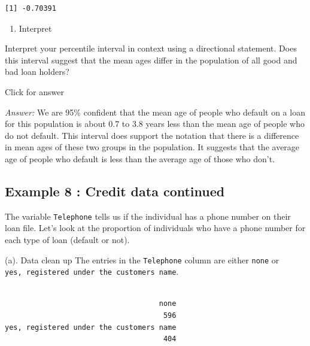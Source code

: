 \documentclass[
]{book}
\newenvironment{Shaded}{\begin{snugshade}}{\end{snugshade}}
\newcommand{\FunctionTok}[1]{\textcolor[rgb]{0.00,0.00,0.00}{#1}}
\newcommand{\NormalTok}[1]{#1}
\newcommand{\SpecialCharTok}[1]{\textcolor[rgb]{0.00,0.00,0.00}{#1}}
\providecommand{\tightlist}{%
  \setlength{\itemsep}{0pt}\setlength{\parskip}{0pt}}
\begin{document}
\begin{verbatim}
[1] -0.70391
\end{verbatim}

\begin{enumerate}
\def\labelenumi{(\alph{enumi})}
\setcounter{enumi}{2}
\tightlist
\item
  Interpret
\end{enumerate}

Interpret your percentile interval in context using a directional statement. Does this interval suggest that the mean ages differ in the population of all good and bad loan holders?

Click for answer

\emph{Answer:} We are 95\% confident that the mean age of people who default on a loan for this population is about 0.7 to 3.8 years less than the mean age of people who do not default. This interval does support the notation that there is a difference in mean ages of these two groups in the population. It suggests that the average age of people who default is less than the average age of those who don't.

\hypertarget{example-8-credit-data-continued}{%
\subsection{Example 8 : Credit data continued}\label{example-8-credit-data-continued}}

The variable \texttt{Telephone} tells us if the individual has a phone number on their loan file. Let's look at the proportion of individuals who have a phone number for each type of loan (default or not).

(a). Data clean up
The entries in the \texttt{Telephone} column are either \texttt{none} or \texttt{yes,\ registered\ under\ the\ customers\ name}.

\begin{Shaded}
\end{Shaded}

\begin{verbatim}

                                    none 
                                     596 
yes, registered under the customers name 
                                     404 
\end{verbatim}
\end{document}
